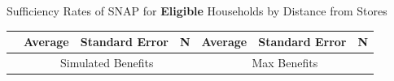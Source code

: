 \documentclass{beamer}
\begin{document}
\begin{frame}
\begin{table}[htbp]{Sufficiency Rates of SNAP for \textbf{Eligible} Households by Distance from Stores}

\begin{adjustbox}{height=1.5in}
    
    \begin{tabular}{lllllll}
    \toprule
          & Average & Standard Error & N     & Average & Standard Error & N \\
    \midrule
     & \multicolumn{3}{c}{Simulated Benefits} & \multicolumn{3}{c}{Max Benefits} \\
    

\end{tabular}
\end{adjustbox}
\end{table}
\end{frame}
\end{document}
